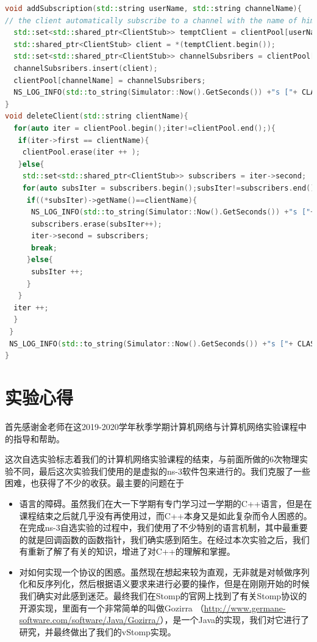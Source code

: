 \documentclass{ctexrep}
\begin{document}
	\begin{lstlisting}[language=c++]
void addSubscription(std::string userName, std::string channelName){
// the client automatically subscribe to a channel with the name of himself
  std::set<std::shared_ptr<ClientStub>> temptClient = clientPool[userName];
  std::shared_ptr<ClientStub> client = *(temptClient.begin());
  std::set<std::shared_ptr<ClientStub>> channelSubsribers = clientPool[channelName];
  channelSubsribers.insert(client);
  clientPool[channelName] = channelSubsribers;
  NS_LOG_INFO(std::to_string(Simulator::Now().GetSeconds()) +"s ["+ CLASSNAME +"]:             " + userName +" is add to group " + channelName);
}
void deleteClient(std::string clientName){
  for(auto iter = clientPool.begin();iter!=clientPool.end();){
   if(iter->first == clientName){
    clientPool.erase(iter ++ );
   }else{
    std::set<std::shared_ptr<ClientStub>> subscribers = iter->second;
    for(auto subsIter = subscribers.begin();subsIter!=subscribers.end();){
     if((*subsIter)->getName()==clientName){
      NS_LOG_INFO(std::to_string(Simulator::Now().GetSeconds()) +"s ["+ CLASSNAME +"]:             " + clientName + " unsubscribe " + iter->first);
      subscribers.erase(subsIter++);
      iter->second = subscribers;
      break;
     }else{
      subsIter ++;
     }
   }
  iter ++;
  }
 }
 NS_LOG_INFO(std::to_string(Simulator::Now().GetSeconds()) +"s ["+ CLASSNAME +"]:             " + clientName + " is leaving.");
}
	\end{lstlisting}
	\chapter{实验心得}
	首先感谢金老师在这2019-2020学年秋季学期计算机网络与计算机网络实验课程中的指导和帮助。
	
	这次自选实验标志着我们的计算机网络实验课程的结束，与前面所做的6次物理实验不同，最后这次实验我们使用的是虚拟的ns-3软件包来进行的。我们克服了一些困难，也获得了不少的收获。最主要的问题在于\begin{itemize}
		\item 语言的障碍。虽然我们在大一下学期有专门学习过一学期的C++语言，但是在课程结束之后就几乎没有再使用过，而C++本身又是如此复杂而令人困惑的。在完成ns-3自选实验的过程中，我们使用了不少特别的语言机制，其中最重要的就是回调函数的函数指针，我们确实感到陌生。在经过本次实验之后，我们有重新了解了有关的知识，增进了对C++的理解和掌握。
		\item 对如何实现一个协议的困惑。虽然现在想起来较为直观，无非就是对帧做序列化和反序列化，然后根据语义要求来进行必要的操作，但是在刚刚开始的时候我们确实对此感到迷茫。最终我们在Stomp的官网上找到了有关Stomp协议的开源实现，里面有一个非常简单的叫做Gozirra （\url{http://www.germane-software.com/software/Java/Gozirra/}），是一个Java的实现，我们对它进行了研究，并最终做出了我们的vStomp实现。
	\end{itemize}
\end{document}

